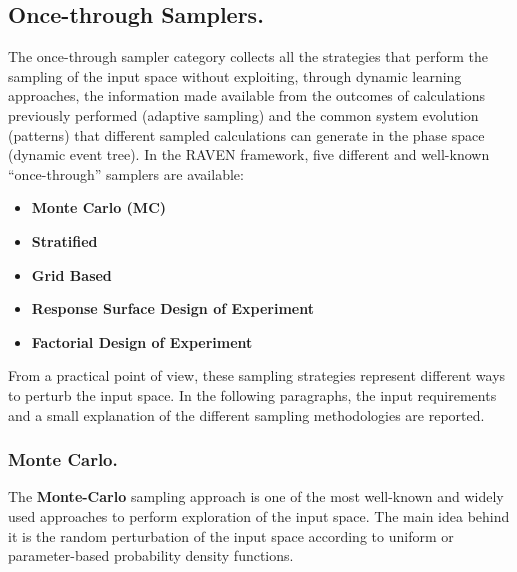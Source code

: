 \subsection{Once-through Samplers.}
\label{subsec:onceThroughSamplers}
The once-through sampler category collects all the strategies that perform the
sampling of the input space without exploiting, through dynamic learning
approaches, the information made available from the outcomes of calculations
previously performed (adaptive sampling) and the common system evolution
(patterns) that different sampled calculations can generate in the phase space
(dynamic event tree).
%
In the RAVEN framework, five different and well-known “once-through” samplers
are available:
\begin{itemize}
\item \textbf{Monte Carlo (MC)}
\item \textbf{Stratified}
\item \textbf{Grid Based}
\item \textbf{Response Surface Design of Experiment}
\item \textbf{Factorial Design of Experiment}
\end{itemize}

From a practical point of view, these sampling strategies represent different
ways to perturb the input space.
%
In the following paragraphs, the input requirements and a small explanation of
the different sampling methodologies are reported.

\subsubsection{Monte Carlo.}
\label{subsubsubsec:MC}
The \textbf{Monte-Carlo} sampling approach is one of the most well-known and
widely used approaches to perform exploration of the input space.
%
The main idea behind it is the random perturbation of the input space according
to uniform or parameter-based probability density functions.
%

